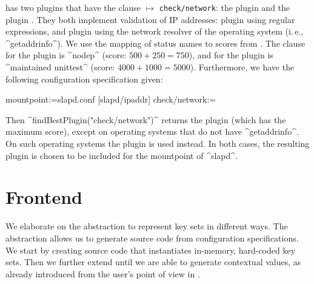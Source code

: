 \begin{example}
\elektra{} has two plugins that have the clause  $\mapsto$ \texttt{check/network}:
the plugin  and the plugin .
They both implement validation of IP addresses:
plugin  using regular expressions, and plugin  using the network resolver of the operating system (i.\,e., ^getaddrinfo^).
We use the mapping of status names to scores from .
The clause  for the plugin  is ^nodep^ (score: $500+250=750$), and for the plugin  is ^maintained unittest^ (score: $4000+1000=5000$).
Furthermore, we have the following configuration specification given:

\begin{code}
[slapd]
  mountpoint:=slapd.conf
[slapd/ipaddr]
  check/network:=
\end{code}

Then ^findBestPlugin("check/network")^ returns the plugin  (which has the maximum score), except on operating systems that do not have ^getaddrinfo^.
On such operating systems the plugin  is used instead.
In both cases, the resulting plugin is chosen to be included for the mountpoint of ^slapd^.
\end{example}
































\section{Frontend}
\label{sec:api}


We elaborate on the abstraction to represent key sets in different ways.
The abstraction allows us to generate source code from configuration specifications.
We start by creating source code that instantiates in-memory, hard-coded key sets.
Then we further extend  until we are able to generate contextual values, as already introduced from the user's point of view in .

